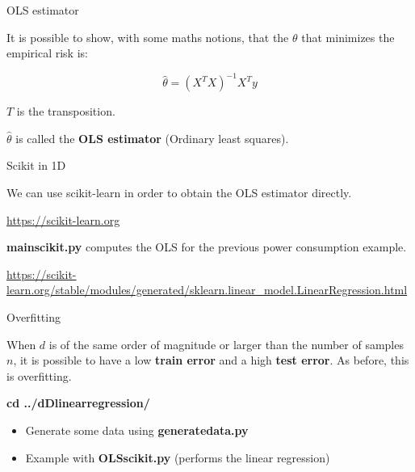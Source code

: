 \documentclass[usenames,dvipsnames,french]{beamer}
\begin{document}
\begin{frame}{OLS estimator}

    It is possible to show, with some maths notions, that the $\theta$ that
    minimizes the empirical risk is:

    \begin{equation}
	\label{def:ols}
	\hat{ \theta}= (X^TX)^{-1}X^Ty
    \end{equation}

    $T$ is the transposition.

    $ \hat{\theta}$ is called the \textbf{OLS estimator} (Ordinary least squares).

\end{frame}


\begin{frame}{Scikit in 1D}

    We can use scikit-learn in order to obtain the OLS estimator directly.

    \url{https://scikit-learn.org} 
    
    \textbf{main\textunderscore scikit.py} computes the OLS for the previous power consumption example.

    \url{https://scikit-learn.org/stable/modules/generated/sklearn.linear_model.LinearRegression.html} 

\end{frame}

\begin{frame}{Overfitting}

    When $d$ is of the same order of magnitude or larger than the number of samples $n$, it is possible to have a low \textbf{train error} and a high \textbf{test error}. As before, this is overfitting.


\textbf{cd ../dD\textunderscore linear\textunderscore regression/}
    \begin{itemize}
        \item Generate some data using \textbf{generate\textunderscore data.py}
        \item Example with \textbf{OLS\textunderscore scikit.py} (performs the linear regression)
    \end{itemize}
\end{frame}
\end{document}
